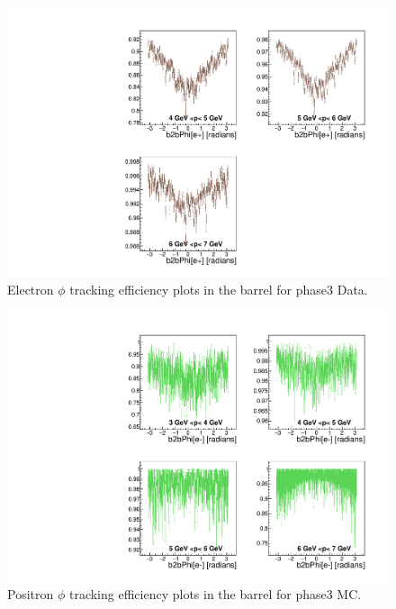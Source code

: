 \documentclass[a4paper,11pt,twosided,final,german,openbib,pdftex,listof=totoc,bibliography=totoc]{scrbook}
\begin{document}
\begin{appendix}
\begin{figure}[!htbp]
	\centering
	\includegraphics[width=\textwidth]{Plots/master3/xPMPhiemBarrel_DataP3}
	\caption[Momentum $\phi$ Electron Barrel Efficiency Phase3 Data]{Electron $\phi$ tracking efficiency plots in the barrel for phase3 Data.}
	\label{plt:PMPhiemBarrel3_Data}
\end{figure}


\begin{figure}[!htbp]
	\centering
	\includegraphics[width=\textwidth]{Plots/master3/xPMPhiepBarrel_MCP3}
	\caption[Momentum $\phi$ Positron Barrel Efficiency Phase3 MC]{Positron $\phi$ tracking efficiency plots in the barrel for phase3 MC.}
	\label{plt:PMPhiepBarrel3_MC}
\end{figure}



\end{appendix}
\end{document}

